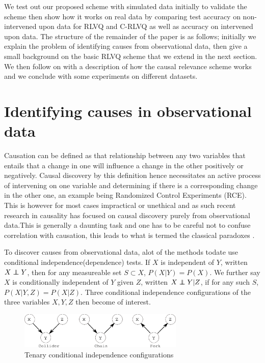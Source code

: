 \documentclass{esannV2}
\newcommand\independent{\protect\mathpalette{\protect\independenT}{\perp}}
\def\independenT#1#2{\mathrel{\rlap{$#1#2$}\mkern2mu{#1#2}}}
\def\ci{\independent}
\begin{document}
We test out our proposed scheme with simulated data initially to validate the scheme then show how it works on real data by comparing test accuracy on non-intervened upon data for RLVQ and C-RLVQ as well as accuracy on intervened upon data. The structure of the remainder of the paper is as follows; initially we explain the problem of identifying causes from observational data, then give a small background on the basic RLVQ scheme that we extend in the next section. We then follow on with a description of how the causal relevance scheme works and we conclude with some experiments on different datasets.

\section{Identifying causes in observational data}
\label{sec:IdentifyingCausesInObservationalData}

Causation can be defined as that relationship between any two variables that entails that a change in one will influence a change in the other positively or negatively. Causal discovery by this definition hence necessitates an active process of intervening on one variable and determining if there is a corresponding change in the other one, an example being Randomized Control Experiments (RCE). This is however for most cases impractical or unethical and as such recent research in causality has focused on causal discovery purely from observational data.This is generally a daunting task and one has to be careful not to confuse correlation with causation, this leads to what is termed the classical paradoxes \cite{06}.

To discover causes from observational data, alot of the methods todate use conditional independence(dependence) tests. If $X$ is independent of $Y$, written $X \ci Y$, then for any measureable set $S \subset X$, $P(X|Y) = P(X)$. We further say $X$ is conditionally independent of $Y$ given $Z$, written $X \ci Y | Z$, if for any such $S$, $P(X|Y,Z) = P(X|Z)$. Three conditional independence configurations of the three variables $X,Y,Z$ then become of interest. 

\begin{figure}[!h]
	\centering
		\includegraphics[width=0.70\textwidth]{vstructure.eps}
	\caption{Tenary conditional independence configurations}
	\label{fig:vstructure}
\end{figure}
\end{document}
